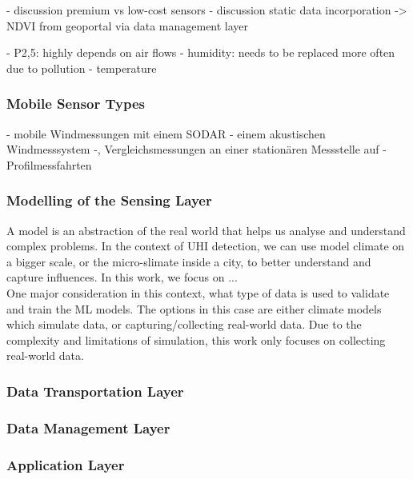 
- discussion premium vs low-cost sensors
- discussion static data incorporation -> NDVI from geoportal via data management layer

- P2,5: highly depends on air flows
- humidity: needs to be replaced more often due to pollution
- temperature

\subsubsection{Mobile Sensor Types}

- mobile Windmessungen mit einem SODAR - einem akustischen Windmesssystem -, Vergleichsmessungen an einer stationären Messstelle auf
- Profilmessfahrten



\subsubsection{Modelling of the Sensing Layer}

A model is an abstraction of the real world that helps us analyse and understand complex problems. In the context of UHI detection, we can use model climate on a bigger scale, or the micro-slimate inside a city, to better understand and capture influences. In this work, we focus on ...\\
One major consideration in this context, what type of data is used to validate and train the ML models. The options in this case are either climate models which simulate data, or capturing/collecting real-world data. Due to the complexity and limitations of simulation, this work only focuses on collecting real-world data.


\subsubsection{Data Transportation Layer}

\subsubsection{Data Management Layer}

\subsubsection{Application Layer}

